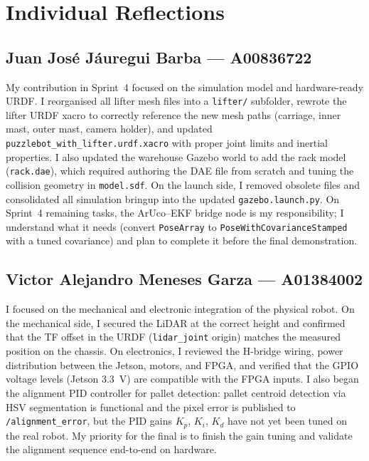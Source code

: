 \documentclass[conference]{IEEEtran}
\begin{document}
\section*{Individual Reflections}

\subsection*{Juan José Jáuregui Barba --- A00836722}

My contribution in Sprint~4 focused on the simulation model and
hardware-ready URDF. I reorganised all lifter mesh files into a
\texttt{lifter/} subfolder, rewrote the lifter URDF xacro to correctly
reference the new mesh paths (carriage, inner mast, outer mast, camera
holder), and updated \texttt{puzzlebot\_with\_lifter.urdf.xacro} with
proper joint limits and inertial properties. I also updated the warehouse
Gazebo world to add the rack model (\texttt{rack.dae}), which required
authoring the DAE file from scratch and tuning the collision geometry in
\texttt{model.sdf}. On the launch side, I removed obsolete files and
consolidated all simulation bringup into the updated \texttt{gazebo.launch.py}.
On Sprint~4 remaining tasks, the ArUco--EKF bridge node is my responsibility;
I understand what it needs (convert \texttt{PoseArray} to
\texttt{PoseWithCovarianceStamped} with a tuned covariance) and plan to
complete it before the final demonstration.

\subsection*{Victor Alejandro Meneses Garza --- A01384002}

I focused on the mechanical and electronic integration of the physical robot.
On the mechanical side, I secured the LiDAR at the correct height and
confirmed that the TF offset in the URDF (\texttt{lidar\_joint} origin)
matches the measured position on the chassis. On electronics, I reviewed the
H-bridge wiring, power distribution between the Jetson, motors, and FPGA,
and verified that the GPIO voltage levels (Jetson 3.3~V) are compatible with
the FPGA inputs. I also began the alignment PID controller for pallet
detection: pallet centroid detection via HSV segmentation is functional and
the pixel error is published to \texttt{/alignment\_error}, but the PID gains
$K_p$, $K_i$, $K_d$ have not yet been tuned on the real robot. My priority
for the final is to finish the gain tuning and validate the alignment sequence
end-to-end on hardware.
\end{document}
